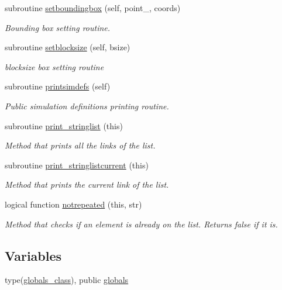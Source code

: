 \begin{DoxyCompactItemize}
subroutine \mbox{\hyperlink{namespacesimulationglobals__mod_abf5afcc12763caab3a5fc394255ced44}{setboundingbox}} (self, point\+\_\+, coords)
\begin{DoxyCompactList}\small\item\em Bounding box setting routine. \end{DoxyCompactList}\item 
subroutine \mbox{\hyperlink{namespacesimulationglobals__mod_af0bc0b00ee3aa2ba9e47dc50daa72799}{setblocksize}} (self, bsize)
\begin{DoxyCompactList}\small\item\em blocksize box setting routine \end{DoxyCompactList}\item 
subroutine \mbox{\hyperlink{namespacesimulationglobals__mod_a54196bff569fc838730ba39a722319ff}{printsimdefs}} (self)
\begin{DoxyCompactList}\small\item\em Public simulation definitions printing routine. \end{DoxyCompactList}\item 
subroutine \mbox{\hyperlink{namespacesimulationglobals__mod_a7adb33aaa9ea0a94c38789c07ff3e787}{print\+\_\+stringlist}} (this)
\begin{DoxyCompactList}\small\item\em Method that prints all the links of the list. \end{DoxyCompactList}\item 
subroutine \mbox{\hyperlink{namespacesimulationglobals__mod_a405f70548e38f0af65d4cbdb7c7025a4}{print\+\_\+stringlistcurrent}} (this)
\begin{DoxyCompactList}\small\item\em Method that prints the current link of the list. \end{DoxyCompactList}\item 
logical function \mbox{\hyperlink{namespacesimulationglobals__mod_a12410ee549ead4c6d892dca6ead74d15}{notrepeated}} (this, str)
\begin{DoxyCompactList}\small\item\em Method that checks if an element is already on the list. Returns false if it is. \end{DoxyCompactList}\end{DoxyCompactItemize}
\subsection*{Variables}
\begin{DoxyCompactItemize}
\item 
type(\mbox{\hyperlink{structsimulationglobals__mod_1_1globals__class}{globals\+\_\+class}}), public \mbox{\hyperlink{namespacesimulationglobals__mod_acf1e2786d81bd0fe337a8458efce8733}{globals}}
\end{DoxyCompactItemize}


